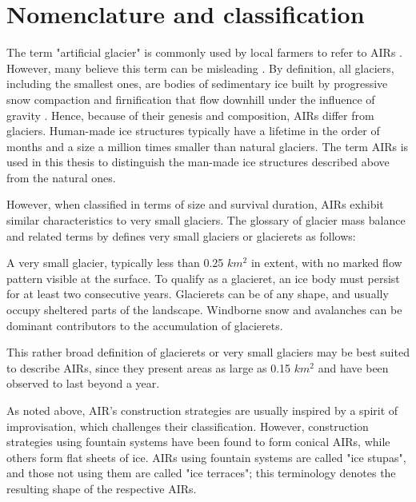 \section{Nomenclature and classification}

The term "artificial glacier" is commonly used by local farmers to refer to \ac{AIRs}
\citep{norphelArtificialGlacierHigh2009}. However, many believe this term can be misleading
\citep{nusserSociohydrologyArtificialGlaciers2019}. By definition, all glaciers, including the smallest ones,
are bodies of sedimentary ice built by progressive snow compaction and firnification that flow
downhill under the influence of gravity \citep{benndouglasGlaciersGlaciation2014}. Hence, because of their
genesis and composition, \ac{AIRs} differ from glaciers. Human-made ice structures typically have a lifetime in
the order of months and a size a million times smaller than natural glaciers. The term \ac{AIRs} is used in this thesis to
distinguish the man-made ice structures described above from the natural ones.

However, when classified in terms of size and survival duration, \ac{AIRs} exhibit similar characteristics to
very small glaciers. The glossary of glacier mass balance and related terms by
\citet{cogleyGlossaryGlacierMass2010} defines very small glaciers or glacierets as follows:

\begin{thesis_quotation}
	A very small glacier, typically less than 0.25 $km^2$ in extent, with no marked flow pattern
	visible at the surface. To qualify as a glacieret, an ice body must persist for at least two consecutive
	years. Glacierets can be of any shape, and usually occupy sheltered parts of the landscape. Windborne snow and
	avalanches can be dominant contributors to the accumulation of glacierets.
\end{thesis_quotation}

This rather broad definition of glacierets or very small glaciers may be best suited to describe AIRs, since
they present areas as large as 0.15 $km^2$ \citep{nusserSociohydrologyArtificialGlaciers2019} and
have been observed to last beyond a year.

As noted above, AIR's construction strategies are usually inspired by a spirit of improvisation, which challenges
their classification. However, construction strategies using fountain systems have been found to form
conical \ac{AIRs}, while others form flat sheets of ice. \ac{AIRs} using fountain systems are called
"ice stupas", and those not using them are called "ice terraces"; this terminology denotes the resulting shape of the
respective \ac{AIRs}.

